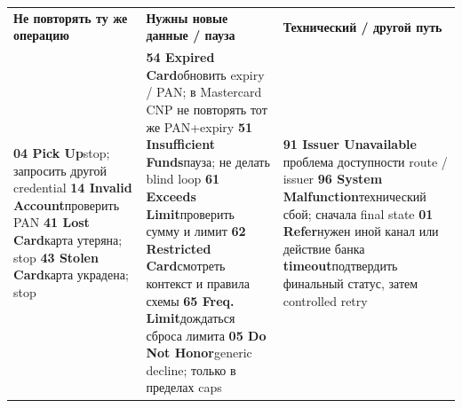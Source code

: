 \begingroup
\scriptsize
\renewcommand{\arraystretch}{1.22}

\begin{tabularx}{\textwidth}{Y Y Y}
  \textbf{Не повторять ту же операцию}
  &
  \textbf{Нужны новые данные / пауза}
  &
  \textbf{Технический / другой путь}
  \\

  \textbf{04 Pick Up}\newline stop; запросить другой credential
  \newline\textbf{14 Invalid Account}\newline проверить PAN
  \newline\textbf{41 Lost Card}\newline карта утеряна; stop
  \newline\textbf{43 Stolen Card}\newline карта украдена; stop
  &
  \textbf{54 Expired Card}\newline обновить expiry
  / PAN; в Mastercard CNP не повторять тот же PAN+expiry
  \newline\textbf{51 Insufficient Funds}\newline пауза; не делать blind loop
  \newline\textbf{61 Exceeds Limit}\newline проверить сумму и лимит
  \newline\textbf{62 Restricted Card}\newline смотреть контекст и правила схемы
  \newline\textbf{65 Freq. Limit}\newline дождаться сброса лимита
  \newline\textbf{05 Do Not Honor}\newline generic decline; только в
  пределах caps &
  \textbf{91 Issuer Unavailable}\newline
  проблема доступности route / issuer
  \newline\textbf{96 System Malfunction}\newline технический сбой;
  сначала final state
  \newline\textbf{01 Refer}\newline нужен иной канал или действие банка
  \newline\textbf{timeout}\newline подтвердить финальный статус,
  затем controlled retry \\[0.45ex]
\end{tabularx}

\endgroup
